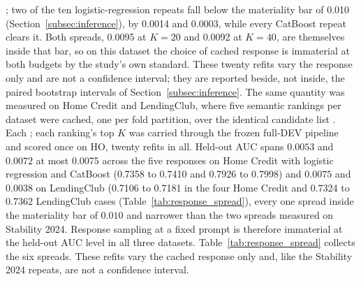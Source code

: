 \documentclass[final,5p,twocolumn]{elsarticle}
\newcommand{\Kfeat}{K}
\providecommand{\DIFaddtex}[1]{{\protect\color{blue} \sf #1}} %
\providecommand{\DIFdeltex}[1]{{\protect\color{red} \scriptsize #1}} %
\providecommand{\DIFaddbegin}{} %
\providecommand{\DIFaddend}{} %
\providecommand{\DIFdelbegin}{} %
\providecommand{\DIFdelend}{} %
\providecommand{\DIFadd}[1]{\texorpdfstring{\DIFaddtex{#1}}{#1}} %
\providecommand{\DIFdel}[1]{\texorpdfstring{\DIFdeltex{#1}}{}} %
\begin{document}
\DIFaddbegin \DIFadd{; }\DIFaddend two of the ten logistic-regression repeats fall below the materiality bar of 0.010 (Section~\ref{subsec:inference}), by 0.0014 and 0.0003, while every CatBoost repeat clears it. Both spreads, 0.0095 at $\Kfeat=20$ and 0.0092 at $\Kfeat=40$, are themselves inside that bar, so on this dataset the choice of cached response is immaterial at both budgets by the study's own standard. These twenty refits vary the response only and are not a confidence interval; they are reported beside, not inside, the paired bootstrap intervals of Section~\ref{subsec:inference}. The same quantity was measured on Home Credit and LendingClub, where five semantic rankings per dataset were cached, one per fold partition, over the identical candidate list\DIFdelbegin \DIFdel{. Each }\DIFdelend \DIFaddbegin \DIFadd{; each }\DIFaddend ranking's top $\Kfeat$ was carried through the frozen full-DEV pipeline and scored once on HO, twenty refits in all. Held-out AUC spans \DIFdelbegin \DIFdel{$0.0053$ and $0.0072$ }\DIFdelend \DIFaddbegin \DIFadd{at most 0.0075 }\DIFaddend across the five responses \DIFdelbegin \DIFdel{on Home Credit with logistic regression and CatBoost (0.7358 to 0.7410 and 0.7926 to 0.7998) and $0.0075$ and $0.0038$ on LendingClub (0.7106 to 0.7181 }\DIFdelend \DIFaddbegin \DIFadd{in the four Home Credit }\DIFaddend and \DIFdelbegin \DIFdel{0.7324 to 0.7362}\DIFdelend \DIFaddbegin \DIFadd{LendingClub cases (Table~\ref{tab:response_spread}}\DIFaddend ), every \DIFdelbegin \DIFdel{one }\DIFdelend \DIFaddbegin \DIFadd{spread }\DIFaddend inside the materiality bar of $0.010$ and narrower than the two spreads measured on Stability 2024. Response sampling at a fixed prompt is therefore immaterial at the held-out AUC level in all three datasets.
\DIFdelbegin \DIFdel{Table~\ref{tab:response_spread} collects the six spreads. These refits vary the cached response only and, like the Stability 2024 repeats, are not a confidence interval. }\DIFdelend \DIFaddbegin 
\end{document}
